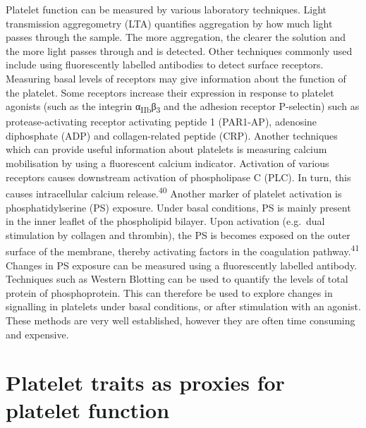 \documentclass[11pt,twoside]{bristolthesis}
\begin{document}
Platelet function can be measured by various laboratory techniques. Light transmission aggregometry (LTA) quantifies aggregation by how much light passes through the sample. The more aggregation, the clearer the solution and the more light passes through and is detected. Other techniques commonly used include using fluorescently labelled antibodies to detect surface receptors. Measuring basal levels of receptors may give information about the function of the platelet. Some receptors increase their expression in response to platelet agonists (such as the integrin α\textsubscript{IIb}β\textsubscript{3} and the adhesion receptor P-selectin) such as protease-activating receptor activating peptide 1 (PAR1-AP), adenosine diphosphate (ADP) and collagen-related peptide (CRP). Another techniques which can provide useful information about platelets is measuring calcium mobilisation by using a fluorescent calcium indicator. Activation of various receptors causes downstream activation of phospholipase C (PLC). In turn, this causes intracellular calcium release.\textsuperscript{40} Another marker of platelet activation is phosphatidylserine (PS) exposure. Under basal conditions, PS is mainly present in the inner leaflet of the phospholipid bilayer. Upon activation (e.g.~dual stimulation by collagen and thrombin), the PS is becomes exposed on the outer surface of the membrane, thereby activating factors in the coagulation pathway.\textsuperscript{41} Changes in PS exposure can be measured using a fluorescently labelled antibody. Techniques such as Western Blotting can be used to quantify the levels of total protein of phosphoprotein. This can therefore be used to explore changes in signalling in platelets under basal conditions, or after stimulation with an agonist. These methods are very well established, however they are often time consuming and expensive.

\hypertarget{platelet-traits-as-proxies-for-platelet-function}{%
\section{Platelet traits as proxies for platelet function}\label{platelet-traits-as-proxies-for-platelet-function}}
\end{document}
